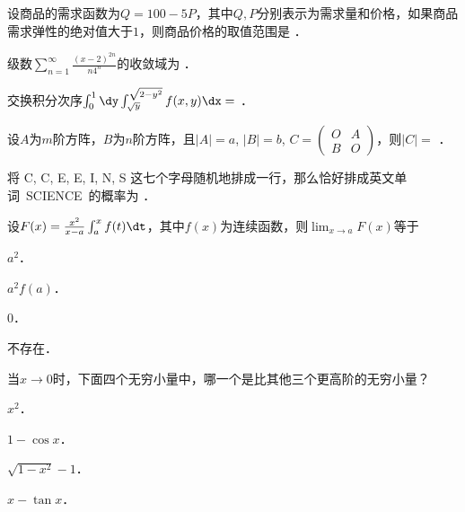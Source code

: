 \documentclass[plain,noanswer,medmath]{../../template/jnuexam}
\begin{document}




\begin{problem}
设商品的需求函数为$Q = 100 - 5P$，其中$Q,P$分别表示为需求量和价格，如果商品需求弹性的绝对值大于$1$，则商品价格的取值范围是 \fillin{}．
\end{problem}


\begin{problem}
级数$\sum_{n = 1}^{\infty}\frac{(x - 2)^{2n}}{n4^n}$的收敛域为 \fillin{}．
\end{problem}


\begin{problem}
交换积分次序$\int_0^1\dy \int_{\sqrt{y}}^{\sqrt{2 - y^2}} f(x,y)\dx =$ \fillin{}．
\end{problem}


\begin{problem}
设$A$为$m$阶方阵，$B$为$n$阶方阵，且$|A| = a$, $|B| = b$, $C = \begin{pmatrix}
  O & A \\
  B & O
\end{pmatrix}$，则$|C| =$ \fillin{}．
\end{problem}


\begin{problem}
将 C, C, E, E, I, N, S 这七个字母随机地排成一行，那么恰好排成英文单词~\hbox{SCIENCE}~的概率为 \fillin{}．
\end{problem}




\begin{problem}
设$F(x) = \frac{x^2}{x - a}\int_a^x f(t) \dt$，其中$f(x)$为连续函数，则$\lim_{x \to a} F(x)$等于\pickout{}
\begin{abcd}
\item $a^2$．        
\item $a^2 f(a)$．        
\item $0$．        
\item 不存在．
\end{abcd}
\end{problem}


\begin{problem}
当$x \to 0$时，下面四个无穷小量中，哪一个是比其他三个更高阶的无穷小量？\pickout{}
\begin{abcd}
\item $x^2$．     
\item $1 - \cos x$．     
\item $\sqrt{1 - x^2} - 1$．     
\item $x - \tan x$．
\end{abcd}
\end{problem}
\end{document}
